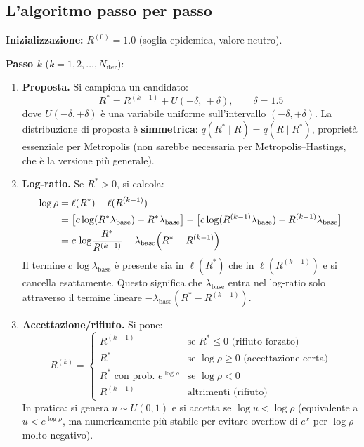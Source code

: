 \documentclass[12pt,a4paper]{article}
\newcommand{\lbase}{\lambda_{\mathrm{base}}}
\begin{document}
\subsection{L'algoritmo passo per passo}

\textbf{Inizializzazione:} $R^{(0)} = 1.0$ (soglia epidemica, valore neutro).

\medskip
\textbf{Passo $k$} ($k = 1, 2, \ldots, N_{\mathrm{iter}}$):

\begin{enumerate}[label=\textbf{\alph*)}]
  \item \textbf{Proposta.} Si campiona un candidato:
    \begin{equation}
      R^* = R^{(k-1)} + U(-\delta,\, +\delta), \qquad \delta = 1.5
      \label{eq:proposta}
    \end{equation}
    dove $U(-\delta, +\delta)$ è una variabile uniforme sull'intervallo $(-\delta, +\delta)$.
    La distribuzione di proposta è \textbf{simmetrica}: $q(R^* \mid R) = q(R \mid R^*)$,
    proprietà essenziale per Metropolis (non sarebbe necessaria per Metropolis--Hastings,
    che è la versione più generale).

  \item \textbf{Log-ratio.} Se $R^* > 0$, si calcola:
    \begin{align}
      \log\rho &= \ell(R^*) - \ell(R^{(k-1)}) \notag \\
               &= \bigl[c\log(R^*\lbase) - R^*\lbase\bigr]
                  - \bigl[c\log(R^{(k-1)}\lbase) - R^{(k-1)}\lbase\bigr] \notag \\
               &= c\,\log\!\frac{R^*}{R^{(k-1)}} - \lbase\!\left(R^* - R^{(k-1)}\right)
      \label{eq:logrho}
    \end{align}
    Il termine $c\,\log\lbase$ è presente sia in $\ell(R^*)$ che in $\ell(R^{(k-1)})$
    e si cancella esattamente. Questo significa che $\lbase$ entra nel log-ratio
    solo attraverso il termine lineare $-\lbase(R^* - R^{(k-1)})$.

  \item \textbf{Accettazione/rifiuto.} Si pone:
    \begin{equation}
      R^{(k)} =
      \begin{cases}
        R^{(k-1)}              & \text{se } R^* \le 0 \text{ (rifiuto forzato)} \\
        R^*                    & \text{se } \log\rho \ge 0 \text{ (accettazione certa)} \\
        R^* \text{ con prob.\ } e^{\log\rho} & \text{se } \log\rho < 0 \\
        R^{(k-1)}              & \text{altrimenti (rifiuto)}
      \end{cases}
      \label{eq:accettazione}
    \end{equation}
    In pratica: si genera $u \sim U(0,1)$ e si accetta se $\log u < \log\rho$
    (equivalente a $u < e^{\log\rho}$, ma numericamente più stabile per evitare
    overflow di $e^x$ per $\log\rho$ molto negativo).
\end{enumerate}
\end{document}
